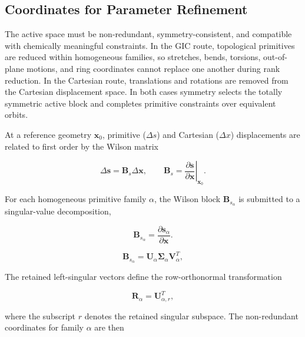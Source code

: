 \documentclass[aip,jcp,reprint,longbibliography,floatfix]{revtex4-2}
\begin{document}
\subsection{Coordinates for Parameter Refinement}

The active space must be non-redundant, symmetry-consistent, and compatible
with chemically meaningful constraints. In the GIC route, topological
primitives are reduced within homogeneous families, so stretches, bends,
torsions, out-of-plane motions, and ring coordinates cannot replace one
another during rank reduction.\cite{PulayFogarasi1992,Peng1996Redundant,Baker1996Delocalized,BakkenHelgaker2002}
In the Cartesian route, translations and rotations are removed from the
Cartesian displacement space. In both cases symmetry selects the totally
symmetric active block and completes primitive constraints over equivalent
orbits.

At a reference geometry $\mathbf{x}_0$, primitive ($\Delta s$) and Cartesian
($\Delta x$) displacements are related to first order by the Wilson matrix\cite{Wilson1955}

\begin{equation}
\Delta \mathbf{s}
=
\mathbf{B}_s
\Delta \mathbf{x},
\qquad
\mathbf{B}_s =
\left.
\frac{\partial \mathbf{s}}
{\partial \mathbf{x}}
\right|_{\mathbf{x}_0}.
\end{equation}

For each homogeneous primitive family $\alpha$, the Wilson block
$\mathbf{B}_{s_\alpha}$ is submitted to a singular-value
decomposition,\cite{GolubReinsch1970}

\begin{equation}
\mathbf{B}_{s_\alpha}
=
\frac{\partial\mathbf{s}_\alpha}
{\partial\mathbf{x}} .
\end{equation}

\begin{equation}
\mathbf{B}_{s_\alpha}
=
\mathbf{U}_{\alpha}
\boldsymbol{\Sigma}_{\alpha}
\mathbf{V}_{\alpha}^{T},
\end{equation}

The retained left-singular vectors define the row-orthonormal transformation

\begin{equation}
\mathbf{R}_{\alpha}
=
\mathbf{U}_{\alpha,r}^{T},
\end{equation}

where the subscript $r$ denotes the retained singular subspace. The
non-redundant coordinates for family $\alpha$ are then
\end{document}
